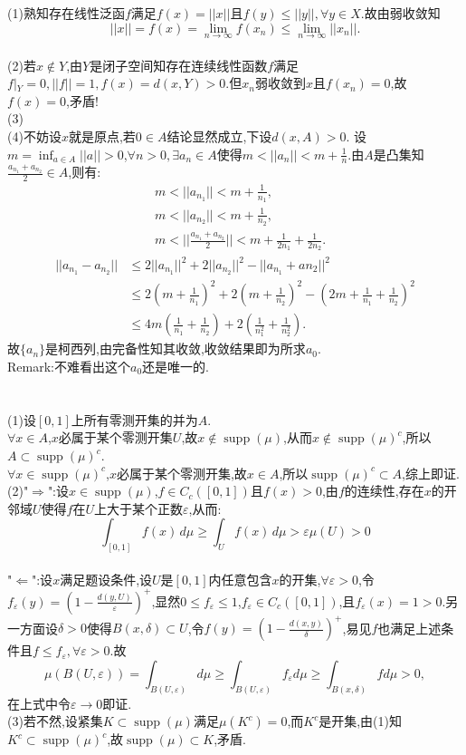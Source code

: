 \documentclass{article}
\DeclareMathOperator{\supp}{supp}
\begin{document}
\section{}
\noindent (1)熟知存在线性泛函$f$满足$f(x)=||x||$且$f(y)\leq||y||,\forall y\in X.$故由弱收敛知$$||x||=f(x)=\lim_{n\rightarrow\infty}f(x_{n})\leq\lim_{n\rightarrow\infty}||x_{n}||.$$\\
(2)若$x\notin Y$,由$Y$是闭子空间知存在连续线性函数$f$满足$f|_Y=0,||f||=1,f(x)=d(x,Y)>0$.但$x_n$弱收敛到$x$且$f(x_n)=0$,故$f(x)=0$,矛盾!\\
(3)\\
(4)不妨设$x$就是原点,若$0\in A$结论显然成立,下设$d(x,A)>0$.
设$m=\inf_{a\in A}||a||>0$,$\forall n>0,\exists a_n\in A$使得$m<||a_n||<m+\frac{1}{n}$.由$A$是凸集知$\frac{a_{n_1}+a_{n_2}}{2}\in A$,则有:\begin{align}
    &m<||a_{n_1}||<m+\frac{1}{n_1},\\
    &m<||a_{n_2}||<m+\frac{1}{n_2},\\
    &m<||\frac{a_{n_1}+a_{n_2}}{2}||<m+\frac{1}{2n_1}+\frac{1}{2n_2}.
\end{align}
\begin{align}
    ||a_{n_1}-a_{n_2}||&\leq 2||a_{n_1}||^2+2||a_{n_2}||^2-||a_{n_1}+a{n_2}||^2\\&\leq 2(m+\frac{1}{n_1})^2+2(m+\frac{1}{n_2})^2-(2m+\frac{1}{n_1}+\frac{1}{n_2})^2\\&\leq 4m(\frac{1}{n_1}+\frac{1}{n_2})+2(\frac{1}{n_1^2}+\frac{1}{n_2^2}).
\end{align}
故$\{a_n\}$是柯西列,由完备性知其收敛,收敛结果即为所求$a_0$.\\
Remark:不难看出这个$a_0$还是唯一的.\\
\section{}
\noindent(1)设$[0,1]$上所有零测开集的并为$A$.\\
$\forall x\in A$,$x$必属于某个零测开集$U$,故$x\notin\supp(\mu)$,从而$x\notin\supp(\mu)^{c}$,所以$A\subset \supp(\mu)^{c}$.\\
$\forall x\in \supp(\mu)^{c}$,$x$必属于某个零测开集,故$x\in A$,所以$\supp(\mu)^{c}\subset A$,综上即证.\\
(2)"$\Rightarrow$":设$x\in\supp(\mu)$,$f\in C_{c}([0,1])$且$f(x)>0$,由$f$的连续性,存在$x$的开邻域$U$使得$f$在$U$上大于某个正数$\varepsilon$,从而:$$\int_{[0,1]}f(x)\,d\mu\geq\int_{U}f(x)\,d\mu >\varepsilon\mu(U)>0$$\\
"$\Leftarrow$":设$x$满足题设条件,设$U$是$[0,1]$内任意包含$x$的开集,$\forall\varepsilon>0$,令$f_{\varepsilon}(y)=(1-\frac{d(y,U)}{\varepsilon})^{+}$,显然$0\leq f_{\varepsilon}\leq 1$,$f_{\varepsilon}\in C_{c}([0,1])$,且$f_{\varepsilon}(x)=1>0$.另一方面设$\delta>0$使得$B(x,\delta)\subset U$,令$f(y)=(1-\frac{d(x,y)}{\delta})^{+}$,易见$f$也满足上述条件且$f\leq f_{\varepsilon},\forall\varepsilon>0$.故$$\mu(B(U,\varepsilon))=\int_{B(U,\varepsilon)}d\mu\geq\int_{B(U,\varepsilon)}f_{\varepsilon}d\mu\geq\int_{B(x,\delta)}fd\mu>0,$$在上式中令$\varepsilon\rightarrow 0$即证.\\
(3)若不然,设紧集$K\subset\supp(\mu)$满足$\mu(K^c)=0$,而$K^c$是开集,由(1)知$K^c\subset\supp(\mu)^c$,故$\supp(\mu)\subset K$,矛盾.\\
\end{document}

